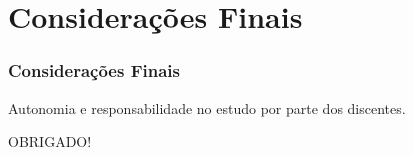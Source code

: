 \section{Considerações Finais}


\begin{frame}
	\frametitle{Considerações Finais}
	
	Autonomia e responsabilidade no estudo por parte dos discentes. \pause
\begin{center}
	OBRIGADO!
\end{center}

\end{frame}
